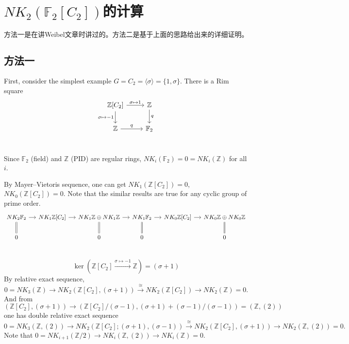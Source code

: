 \section{$NK_2(\mathbb{F}_2[C_2])$的计算}
方法一是在讲Weibel文章\cite{weibel2009nk0}时讲过的。方法二是基于上面的思路给出来的详细证明。
{\normalsize \color{gray}\subsection{方法一}
\label{sec:C2Cp}
First, consider the simplest example $G=C_2=\langle \sigma \rangle=\{1,\sigma\}$. There is a Rim square
\begin{equation}
\label{rimsqC2}
	\begin{tikzcd}
		\mathbb{Z}[C_2] \ar[r,"\sigma\mapsto 1"] \ar[d,"\sigma\mapsto -1"']& \mathbb{Z}\ar[d,"q"]\\
		 \mathbb{Z}\ar[r,"q"] & \mathbb{F}_2\\
	\end{tikzcd}
\end{equation}
	
Since $\mathbb{F}_2$ (field) and $\mathbb{Z}$ (PID) are regular rings, $NK_i(\mathbb{F}_2)=0=NK_i(\mathbb{Z})$ for all $i$.

By Mayer–Vietoris sequence, one can get $NK_1(\mathbb{Z}[C_2])=0$, $NK_0(\mathbb{Z}[C_2])=0$. Note that the similar results are true for any cyclic group of prime order.
	\[\begin{tikzcd}[column sep=small]
		NK_2 \mathbb{F}_2 \ar[r] \ar[d,equal]& NK_1 \mathbb{Z}[C_2] \ar[r] & NK_1 \mathbb{Z} \oplus NK_1 \mathbb{Z} \ar[r] \ar[d,equal]& NK_1 \mathbb{F}_2 \ar[r] \ar[d,equal] & NK_0 \mathbb{Z}[C_2] \ar[r]&NK_0 \mathbb{Z} \oplus NK_0 \mathbb{Z}  \ar[d,equal] \\
		0 & & 0 &0 & & 0\\
	\end{tikzcd}\]

\[\ker(\mathbb{Z}[C_2]\overset{\sigma \mapsto -1}\longrightarrow \mathbb{Z}) =(\sigma +1)\]
By relative exact sequence,
\[0=NK_3(\mathbb{Z})\longrightarrow NK_2(\mathbb{Z}[C_2],(\sigma+1))\overset{\cong}\longrightarrow NK_2(\mathbb{Z}[C_2])\longrightarrow NK_2(\mathbb{Z})=0.\]
And from $(\mathbb{Z}[C_2],(\sigma+1))\longrightarrow (\mathbb{Z}[C_2]/(\sigma-1),(\sigma+1)+(\sigma-1)/(\sigma-1))=(\mathbb{Z},(2))$ one has double relative exact sequence
\[0=NK_3(\mathbb{Z},(2))\longrightarrow NK_2(\mathbb{Z}[C_2];(\sigma+1),(\sigma-1))\overset{\cong}\longrightarrow NK_2(\mathbb{Z}[C_2],(\sigma+1))\longrightarrow NK_2(\mathbb{Z},(2))=0.\]
Note that $0=NK_{i+1}(\mathbb{Z}/2)\longrightarrow NK_i(\mathbb{Z},(2))\longrightarrow NK_i(\mathbb{Z})=0$.

}
